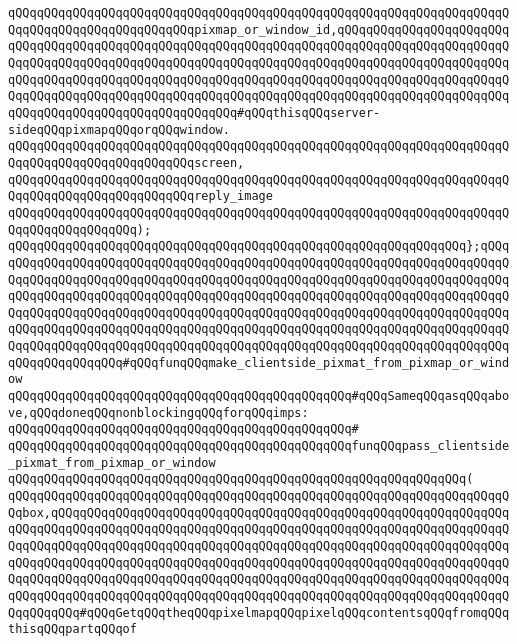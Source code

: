 \verb|qQQqqQQqqQQqqQQqqQQqqQQqqQQqqQQqqQQqqQQqqQQqqQQqqQQqqQQqqQQqqQQqqQQqqQQqqQQqqQQqqQQqqQQqqQQqqQQqpixmap_or_window_id,qQQqqQQqqQQqqQQqqQQqqQQqqQQqqQQqqQQqqQQqqQQqqQQqqQQqqQQqqQQqqQQqqQQqqQQqqQQqqQQqqQQqqQQqqQQqqQQqqQQqqQQqqQQqqQQqqQQqqQQqqQQqqQQqqQQqqQQqqQQqqQQqqQQqqQQqqQQqqQQqqQQqqQQqqQQqqQQqqQQqqQQqqQQqqQQqqQQqqQQqqQQqqQQqqQQqqQQqqQQqqQQqqQQqqQQqqQQqqQQqqQQqqQQqqQQqqQQqqQQqqQQqqQQqqQQqqQQqqQQqqQQqqQQqqQQqqQQqqQQqqQQqqQQqqQQqqQQqqQQqqQQqqQQqqQQqqQQq#qQQqthisqQQqserver-sideqQQqpixmapqQQqorqQQqwindow.|\newline
\verb|qQQqqQQqqQQqqQQqqQQqqQQqqQQqqQQqqQQqqQQqqQQqqQQqqQQqqQQqqQQqqQQqqQQqqQQqqQQqqQQqqQQqqQQqqQQqqQQqscreen,|\newline
\verb|qQQqqQQqqQQqqQQqqQQqqQQqqQQqqQQqqQQqqQQqqQQqqQQqqQQqqQQqqQQqqQQqqQQqqQQqqQQqqQQqqQQqqQQqqQQqqQQqreply_image|\newline
\verb|qQQqqQQqqQQqqQQqqQQqqQQqqQQqqQQqqQQqqQQqqQQqqQQqqQQqqQQqqQQqqQQqqQQqqQQqqQQqqQQqqQQqqQQq);|\newline
\verb|qQQqqQQqqQQqqQQqqQQqqQQqqQQqqQQqqQQqqQQqqQQqqQQqqQQqqQQqqQQqqQQq};qQQqqQQqqQQqqQQqqQQqqQQqqQQqqQQqqQQqqQQqqQQqqQQqqQQqqQQqqQQqqQQqqQQqqQQqqQQqqQQqqQQqqQQqqQQqqQQqqQQqqQQqqQQqqQQqqQQqqQQqqQQqqQQqqQQqqQQqqQQqqQQqqQQqqQQqqQQqqQQqqQQqqQQqqQQqqQQqqQQqqQQqqQQqqQQqqQQqqQQqqQQqqQQqqQQqqQQqqQQqqQQqqQQqqQQqqQQqqQQqqQQqqQQqqQQqqQQqqQQqqQQqqQQqqQQqqQQqqQQqqQQqqQQqqQQqqQQqqQQqqQQqqQQqqQQqqQQqqQQqqQQqqQQqqQQqqQQqqQQqqQQqqQQqqQQqqQQqqQQqqQQqqQQqqQQqqQQqqQQqqQQqqQQqqQQqqQQqqQQqqQQqqQQqqQQqqQQqqQQqqQQqqQQqqQQqqQQqqQQq#qQQqfunqQQqmake_clientside_pixmat_from_pixmap_or_window|\newline
\newline
\newline
\verb|qQQqqQQqqQQqqQQqqQQqqQQqqQQqqQQqqQQqqQQqqQQqqQQq#qQQqSameqQQqasqQQqabove,qQQqdoneqQQqnonblockingqQQqforqQQqimps:|\newline
\verb|qQQqqQQqqQQqqQQqqQQqqQQqqQQqqQQqqQQqqQQqqQQqqQQq#|\newline
\verb|qQQqqQQqqQQqqQQqqQQqqQQqqQQqqQQqqQQqqQQqqQQqqQQqfunqQQqpass_clientside_pixmat_from_pixmap_or_window|\newline
\verb|qQQqqQQqqQQqqQQqqQQqqQQqqQQqqQQqqQQqqQQqqQQqqQQqqQQqqQQqqQQqqQQq(|\newline
\verb|qQQqqQQqqQQqqQQqqQQqqQQqqQQqqQQqqQQqqQQqqQQqqQQqqQQqqQQqqQQqqQQqqQQqqQQqbox,qQQqqQQqqQQqqQQqqQQqqQQqqQQqqQQqqQQqqQQqqQQqqQQqqQQqqQQqqQQqqQQqqQQqqQQqqQQqqQQqqQQqqQQqqQQqqQQqqQQqqQQqqQQqqQQqqQQqqQQqqQQqqQQqqQQqqQQqqQQqqQQqqQQqqQQqqQQqqQQqqQQqqQQqqQQqqQQqqQQqqQQqqQQqqQQqqQQqqQQqqQQqqQQqqQQqqQQqqQQqqQQqqQQqqQQqqQQqqQQqqQQqqQQqqQQqqQQqqQQqqQQqqQQqqQQqqQQqqQQqqQQqqQQqqQQqqQQqqQQqqQQqqQQqqQQqqQQqqQQqqQQqqQQqqQQqqQQqqQQqqQQqqQQqqQQqqQQqqQQqqQQqqQQqqQQqqQQqqQQqqQQqqQQqqQQqqQQqqQQqqQQqqQQqqQQqqQQqqQQqqQQq#qQQqGetqQQqtheqQQqpixelmapqQQqpixelqQQqcontentsqQQqfromqQQqthisqQQqpartqQQqof|\newline
